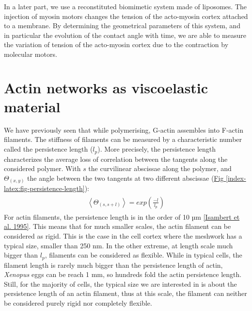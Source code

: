 \documentclass[A4paperpaper,11pt,english]{sphinxmanual}
\begin{document}
In a later part, we use a reconstituted biomimetic system made of liposomes. The
injection of myosin motors changes the tension of the acto-myosin cortex
attached to a membrane. By determining the geometrical parameters of this
system, and in particular the evolution of the contact angle with time, we are
able to measure the variation of tension of the acto-myosin cortex due to the contraction by
molecular motors.


\section{Actin networks as viscoelastic material}
\label{index-latex:viscoelastic}\label{index-latex:actin-networks-as-viscoelastic-material}
We have previously seen that while polymerising, G-actin assembles into F-actin
filaments. The stiffness of filaments can be measured by a characteristic number
called the persistence length (\(l_p\)). More precisely, the
persistence length characterizes the average loss of correlation between the
tangents along the considered polymer. With \(s\) the curvilinear abscissae along the polymer,
and \(\Theta_{(x,y)}\) the angle between the two tangents at two different abscissae (\hyperref[index-latex:fig-persistence-length]{Fig  \ref*{index-latex:fig-persistence-length}}):
\label{index-latex:equation-eqa6}\begin{gather}
\begin{split}\left<\Theta_{(s,s+l)}\right> = exp\left(\frac{-l}{l_p}\right)\end{split}\label{index-latex-eqa6}
\end{gather}
For actin filaments, the
persistence length is in the order of 10 µm {\hyperref[index-latex:isambert1995]{{[}Isambert et al. 1995{]}}}. This means
that for much smaller scales, the actin filament can be considered as rigid.
This is the case in the cell cortex where the meshwork has a typical size, smaller than 250 nm. In
the other extreme, at length scale much bigger than \(l_p\), filaments can
be considered as flexible. While in typical cells, the filament length is
rarely much bigger than the persistence length of actin, \emph{Xenopus} eggs can be
reach 1 mm, so hundreds fold the actin persistence length.
Still, for the majority of cells, the typical size we are interested in
is about the persistence length of an actin filament, thus at this scale, the filament can neither be considered purely
rigid nor completely flexible.
\end{document}
